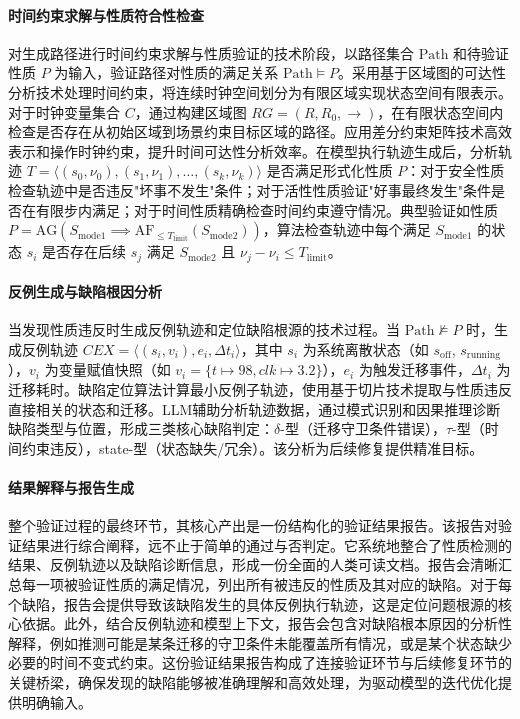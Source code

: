 \paragraph{时间约束求解与性质符合性检查}
对生成路径进行时间约束求解与性质验证的技术阶段，以路径集合 $\text{Path}$ 和待验证性质 $P$ 为输入，验证路径对性质的满足关系 $\text{Path} \models P$。采用基于区域图的可达性分析技术处理时间约束，将连续时钟空间划分为有限区域实现状态空间有限表示。对于时钟变量集合 $C$，通过构建区域图 $RG = (R, R_0, \rightarrow)$，在有限状态空间内检查是否存在从初始区域到场景约束目标区域的路径。应用差分约束矩阵技术高效表示和操作时钟约束，提升时间可达性分析效率。在模型执行轨迹生成后，分析轨迹 $T = \langle (s_0, \nu_0), (s_1, \nu_1), \dots, (s_k, \nu_k) \rangle$ 是否满足形式化性质 $P$：对于安全性质检查轨迹中是否违反"坏事不发生"条件；对于活性性质验证"好事最终发生"条件是否在有限步内满足；对于时间性质精确检查时间约束遵守情况。典型验证如性质 $P = \text{AG}(S_{\text{mode1}} \implies \text{AF}_{\le T_{\text{limit}}}(S_{\text{mode2}}))$，算法检查轨迹中每个满足 $S_{\text{mode1}}$ 的状态 $s_i$ 是否存在后续 $s_j$ 满足 $S_{\text{mode2}}$ 且 $\nu_j - \nu_i \leq T_{\text{limit}}$。

\paragraph{反例生成与缺陷根因分析}
当发现性质违反时生成反例轨迹和定位缺陷根源的技术过程。当 $\text{Path} \nvDash P$ 时，生成反例轨迹 $CEX = \langle (s_i, v_i), e_i, \Delta t_i \rangle$，其中 $s_i$ 为系统离散状态（如 $s_{\text{off}}$, $s_{\text{running}}$），$v_i$ 为变量赋值快照（如 $v_i = \{t \mapsto 98, clk \mapsto 3.2\}$），$e_i$ 为触发迁移事件，$\Delta t_i$ 为迁移耗时。缺陷定位算法计算最小反例子轨迹，使用基于切片技术提取与性质违反直接相关的状态和迁移。LLM辅助分析轨迹数据，通过模式识别和因果推理诊断缺陷类型与位置，形成三类核心缺陷判定：$\delta$-型（迁移守卫条件错误），$\tau$-型（时间约束违反），state-型（状态缺失/冗余）。该分析为后续修复提供精准目标。

\paragraph{结果解释与报告生成}
整个验证过程的最终环节，其核心产出是一份结构化的验证结果报告。该报告对验证结果进行综合阐释，远不止于简单的通过与否判定。它系统地整合了性质检测的结果、反例轨迹以及缺陷诊断信息，形成一份全面的人类可读文档。报告会清晰汇总每一项被验证性质的满足情况，列出所有被违反的性质及其对应的缺陷。对于每个缺陷，报告会提供导致该缺陷发生的具体反例执行轨迹，这是定位问题根源的核心依据。此外，结合反例轨迹和模型上下文，报告会包含对缺陷根本原因的分析性解释，例如推测可能是某条迁移的守卫条件未能覆盖所有情况，或是某个状态缺少必要的时间不变式约束。这份验证结果报告构成了连接验证环节与后续修复环节的关键桥梁，确保发现的缺陷能够被准确理解和高效处理，为驱动模型的迭代优化提供明确输入。

